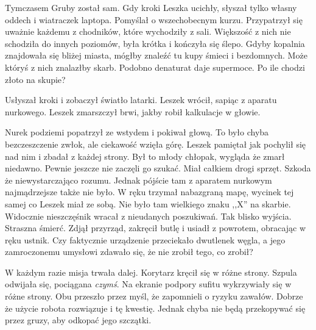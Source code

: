 Tymczasem Gruby został sam. Gdy kroki Leszka ucichły, słyszał tylko własny oddech i wiatraczek laptopa.
Pomyślał o wszechobecnym kurzu.
Przypatrzył się uważnie każdemu z chodników, które wychodziły z sali. Większość z nich nie schodziła do innych poziomów, była krótka i kończyła się ślepo.
Gdyby kopalnia znajdowała się bliżej miasta, mógłby znaleźć tu kupy śmieci i bezdomnych.
Może któryś z nich znalazłby skarb. Podobno denaturat daje supermoce.
Po ile chodzi złoto na skupie?

Usłyszał kroki i zobaczył światło latarki. Leszek wrócił, sapiąc z aparatu nurkowego.
Leszek zmarszczył brwi, jakby robił kalkulacje w głowie.

Nurek podziemi popatrzył ze wstydem i pokiwał głową.
To było chyba bezczeszczenie zwłok, ale ciekawość wzięła górę.
Leszek pamiętał jak pochylił się nad nim i zbadał z każdej strony.
Był to młody chłopak, wygląda że zmarł niedawno. Pewnie jeszcze nie zaczęli go szukać.
Miał całkiem drogi sprzęt. Szkoda że niewystarczająco rozumu.
Jednak pójście tam z aparatem nurkowym najmądrzejsze także nie było.
W ręku trzymał nabazgraną mapę, wycinek tej samej co Leszek miał ze sobą.
Nie było tam wielkiego znaku ,,X'' na skarbie.
Widocznie nieszczęśnik wracał z nieudanych poszukiwań.
Tak blisko wyjścia. Straszna śmierć.
Zdjął przyrząd, zakręcił butlę i usiadł z powrotem, obracając w ręku ustnik.
Czy faktycznie urządzenie przeciekało dwutlenek węgla, a jego zamroczonemu umysłowi zdawało się, że nie zrobił tego, co zrobił?

W każdym razie misja trwała dalej.
Korytarz kręcił się w różne strony. Szpula odwijała się, pociągana \emph{czymś}.
Na ekranie podpory sufitu wykrzywiały się w różne strony.
Obu przeszło przez myśl, że zapomnieli o ryzyku zawałów. Dobrze że użycie robota rozwiązuje i tę kwestię.
Jednak chyba nie będą przekopywać się przez gruzy, aby odkopać jego szczątki.

